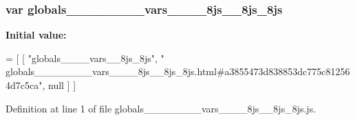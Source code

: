\subsubsection[{globals\+\_\+\+\_\+\+\_\+\+\_\+\+\_\+\+\_\+\+\_\+\+\_\+vars\+\_\+\+\_\+\+\_\+\+\_\+8js\+\_\+\+\_\+8js\+\_\+8js}]{\setlength{\rightskip}{0pt plus 5cm}var globals\+\_\+\+\_\+\+\_\+\+\_\+\+\_\+\+\_\+\+\_\+\+\_\+vars\+\_\+\+\_\+\+\_\+\+\_\+8js\+\_\+\+\_\+8js\+\_\+8js}\label{globals________________vars________8js____8js__8js_8js_a82e5542b11d29ad93554617279caedf7}
{\bfseries Initial value\+:}
\begin{DoxyCode}
=
[
    [ \textcolor{stringliteral}{"globals\_\_\_\_vars\_\_8js\_8js"}, \textcolor{stringliteral}{"
      globals\_\_\_\_\_\_\_\_vars\_\_\_\_8js\_\_8js\_8js.html#a3855473d838853dc775c812564d7c5ca"}, null ]
]
\end{DoxyCode}


Definition at line 1 of file globals\+\_\+\+\_\+\+\_\+\+\_\+\+\_\+\+\_\+\+\_\+\+\_\+vars\+\_\+\+\_\+\+\_\+\+\_\+8js\+\_\+\+\_\+8js\+\_\+8js.\+js.

